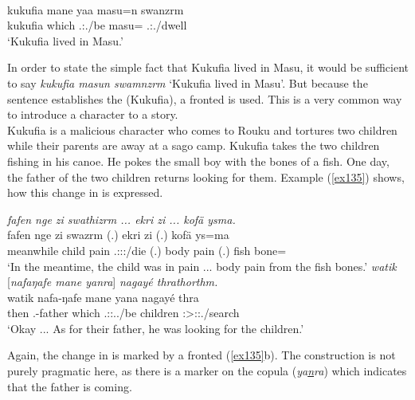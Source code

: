 \begin{exe}
	\\
	\gll kukufia mane yaa masu=n swanzrm\\
	kukufia which \Tsg.\Masc:\Pst.\Ipfv/be masu=\Loc{} \Tsg.\Masc:\Pst.\Dur/dwell\\
	\trans `Kukufia lived in Masu.'
	\label{ex134}
\end{exe}

In order to state the simple fact that Kukufia lived in Masu, it would be sufficient to say \emph{kukufia masun swamnzrm} `Kukufia lived in Masu'. But because the sentence establishes the  (Kukufia), a fronted  is used. This is a very common way to introduce a character to a story.\\

Kukufia is a malicious character who comes to Rouku and tortures two children while their parents are away at a sago camp. Kukufia takes the two children fishing in his canoe. He pokes the small boy with the bones of a fish. One day, the father of the two children returns looking for them. Example (\ref{ex135}) shows, how this change in  is expressed.

\begin{exe}
	\ex \label{ex135}
	\begin{xlist}
	\ex
	\emph{fafen nge zi swathizrm ... ekri zi ... kofä ysma.}\\
	\gll fafen nge zi swazrm (.) ekri zi (.) kofä ys=ma\\
	meanwhile child pain \Tsg.\Masc:\Sbj:\Pst:\Dur/die (.) body pain (.) fish bone=\Char\\
	\trans `In the meantime, the child was in pain ... body pain from the fish bones.'
	\ex \emph{watik} [\emph{nafaŋafe mane yanra}] \emph{nagayé thrathorthm.}\\
	\gll watik nafa-ŋafe mane yana nagayé thra\\
	then \Third.\Poss-father which \Tsg.\Masc:\Sbj:\Pst.\Ipfv.\Venit/be children \Stsg:\Sbj>\Stpl:\Obj:\Irr.\Pfv/search\\
	\trans `Okay ... As for their father, he was looking for the children.'\\
	\end{xlist}
\end{exe}

Again, the change in  is marked by a fronted  (\ref{ex135}b). The construction is not purely pragmatic here, as there is a  marker on the copula (\emph{ya\underline{n}ra}) which indicates that the father is coming.\\

